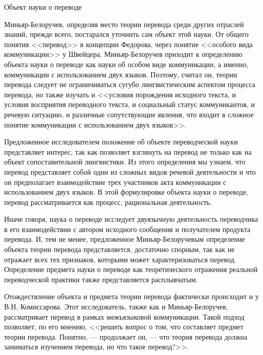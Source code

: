 Объект науки о переводе

Миньяр-Белоручев, определяя место теории перевода среди других отраслей знаний, прежде всего, постарался уточнить сам объект этой науки. От общего понятия <<перевод>> в концепции Федорова, через понятие <<особого вида коммуникации>> у Швейцера, Миньяр-Белоручев приходит к определению объекта науки о переводе как науки об особом виде коммуникации, а именно, коммуникации с использованием двух языков. Поэтому, считал он, теории перевода следует не ограничиваться сугубо лингвистическим аспектом процесса перевода, но также изучать и <<условия порождения исходного текста, и условия восприятия переводного текста, и социальный статус коммуникантов, и речевую ситуацию, и различные сопутствующие явления, что входит в сложное понятие коммуникации с использованием двух языков>>.

Предложенное исследователем положение об объекте переводческой науки представляет интерес, так как позволяет взглянуть на перевод не только как на объект сопоставительной лингвистики. Из этого определения мы узнаем, что перевод представляет собой один из сложных видов речевой деятельности и что он предполагает взаимодействие трех участников акта коммуникации с использованием двух языков. В этой формулировке объекта науки о переводе, %
перевод рассматривается как процесс, рациональная деятельность.

Иначе говоря, наука о переводе исследует двуязычную деятельность переводчика в его взаимодействии с автором исходного сообщения и получателем продукта перевода. И, тем не менее, предложенное Миньяр-Белоручевым определение объекта теории перевода представляется, достаточно спорным, так как не отражает всех тех признаков, которыми может характеризоваться перевод. Определение предмета науки о переводе как теоретического отражения реальной переводческой практики также представляется расплывчатым.

Отождествление объекта и предмета теории перевода фактически происходит и у В.Н. Комиссарова. Этот исследователь, также как и Миньяр-Белоручев, рассматривает перевод в рамках межъязыковой коммуникации. Такой подход позволяет, по его мнению, <<решить вопрос о том, что составляет предмет теории перевода. Понятно, --- продолжает он, --- что теория перевода должна заниматься изучением перевода, но что такое перевод?>>.

